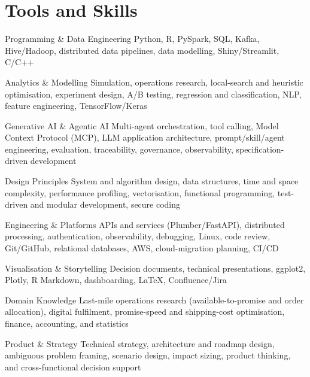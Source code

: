 \documentclass[11pt,a4paper]{moderncv}
\begin{document}
\hypertarget{tools-and-skills}{
\section{Tools and Skills}\label{tools-and-skills}}

\nopagebreak
    {Programming \& Data Engineering}
    {Python, R, PySpark, SQL, Kafka, Hive/Hadoop, distributed data pipelines, data modelling, Shiny/Streamlit, C/C++}
    {}{}{}

    {Analytics \& Modelling}
    {Simulation, operations research, local-search and heuristic optimisation, experiment design, A/B testing, regression and classification, NLP, feature engineering, TensorFlow/Keras}
    {}{}{}

    {Generative AI \& Agentic AI}
    {Multi-agent orchestration, tool calling, Model Context Protocol (MCP), LLM application architecture, prompt/skill/agent engineering, evaluation, traceability, governance, observability, specification-driven development}
    {}{}{}

    {Design Principles}
    {System and algorithm design, data structures, time and space complexity, performance profiling, vectorisation, functional programming, test-driven and modular development, secure coding}
    {}{}{}

    {Engineering \& Platforms}
    {APIs and services (Plumber/FastAPI), distributed processing, authentication, observability, debugging, Linux, code review, Git/GitHub, relational databases, AWS, cloud-migration planning, CI/CD}
    {}{}{}

    {Visualisation \& Storytelling}
    {Decision documents, technical presentations, ggplot2, Plotly, R Markdown, dashboarding, LaTeX, Confluence/Jira}
    {}{}{}

    {Domain Knowledge}
    {Last-mile operations research (available-to-promise and order allocation), digital fulfilment, promise-speed and shipping-cost optimisation, finance, accounting, and statistics}
    {}{}{}

    {Product \& Strategy}
    {Technical strategy, architecture and roadmap design, ambiguous problem framing, scenario design, impact sizing, product thinking, and cross-functional decision support}
    {}{}{}
\end{document}
